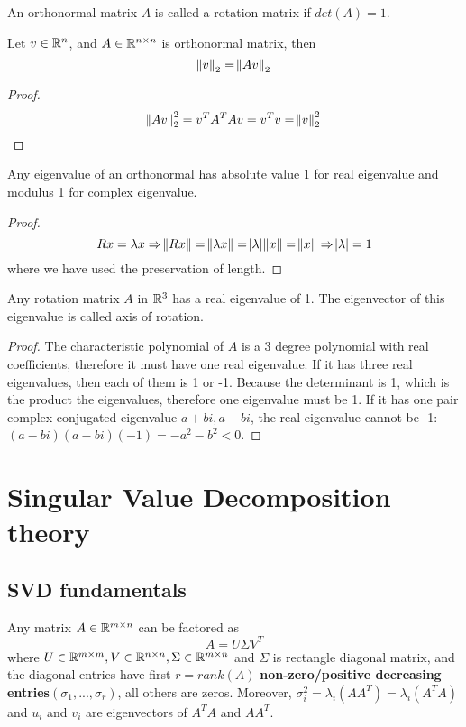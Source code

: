 \begin{refsection}
\begin{definition}
An orthonormal matrix $A$ is called a rotation matrix if $det(A)=1$.
\end{definition}

\begin{lemma}
Let $v\in \mathbb{R}^n$, and $A \in \mathbb{R}^{n\times n}$ is orthonormal matrix, then
$$\norm{v}_2 = \norm{Av}_2$$
\end{lemma}
\begin{proof}
$$\norm{Av}_2^2 = v^TA^TAv = v^Tv = \norm{v}^2_2$$
\end{proof}


\begin{theorem}
Any eigenvalue of an orthonormal has absolute value 1 for real eigenvalue and modulus 1 for complex eigenvalue.
\end{theorem}

\begin{proof}
$$Rx = \lambda x \Rightarrow \norm{Rx} = \norm{\lambda x} = \abs{\lambda}\norm{x} = \norm{x} \Rightarrow \abs{\lambda} = 1$$
where we have used the preservation of length.
\end{proof}


\begin{theorem}
Any rotation matrix $A$ in $\mathbb{R}^3$ has a real eigenvalue of 1. The eigenvector of this eigenvalue is called axis of rotation.
\end{theorem}

\begin{proof}
The characteristic polynomial of $A$ is a 3 degree polynomial with real coefficients, therefore it must have one real eigenvalue. If it has three real eigenvalues, then each of them is 1 or -1. Because the determinant is 1, which is the product the eigenvalues, therefore one eigenvalue must be 1. If it has one pair complex conjugated eigenvalue $a+bi,a-bi$, the real eigenvalue cannot be -1: $(a-bi)(a-bi)(-1) = -a^2-b^2 <0$.
\end{proof}





\section{Singular Value Decomposition theory}
\subsection{SVD fundamentals}
\begin{theorem}\label{ch:linearalgebra:th:SVD}
\cite[142]{calafiore2014optimization} Any matrix $A \in \mathbb{R}^{m\times n}$ can be factored as
$$A = U\Sigma V^T$$
where $U\in \mathbb{R}^{m\times m}, V\in \mathbb{R}^{n\times n}, \Sigma \in \mathbb{R}^{m\times n}$ and $\Sigma$ is rectangle diagonal matrix, and the diagonal entries  have first $r = rank(A)$ \textbf{non-zero/positive decreasing entries}$(\sigma_1,...,\sigma_r)$, all others are zeros. Moreover, $\sigma_i^2 = \lambda_i(AA^T) = \lambda_i(A^TA)$ and $u_i$ and $v_i$ are eigenvectors of $A^TA$ and $AA^T$.
\end{theorem}


\end{refsection}
